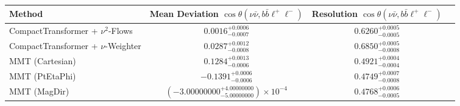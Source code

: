     \begin{tabular}{lccc}
        \toprule
        Method & Mean Deviation $\cos\theta(\nu\bar{\nu}, b\bar{b}\ell^+\ell^-)$ & Resolution $\cos\theta(\nu\bar{\nu}, b\bar{b}\ell^+\ell^-)$ \\
        \midrule
        CompactTransformer + $\nu^2$-Flows & $0.0016^{+0.0006}_{-0.0007}$ & $0.6260^{+0.0005}_{-0.0005}$ \\
        CompactTransformer + $\nu$-Weighter & $0.0287^{+0.0012}_{-0.0008}$ & $0.6850^{+0.0005}_{-0.0008}$ \\
        MMT (Cartesian) & $0.1284^{+0.0013}_{-0.0006}$ & $0.4921^{+0.0004}_{-0.0004}$ \\
        MMT (PtEtaPhi) & $-0.1391^{+0.0006}_{-0.0006}$ & $0.4749^{+0.0007}_{-0.0008}$ \\
        MMT (MagDir) & $(-3.00000000^{+4.00000000}_{-5.00000000})\times 10^{-4}$ & $0.4768^{+0.0006}_{-0.0005}$ \\
        \bottomrule
    \end{tabular}
